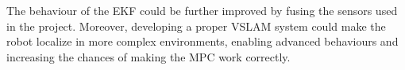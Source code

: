 \documentclass[a4paper]{article}
\begin{document}
The behaviour of the EKF could be further improved by fusing the sensors used in
the project. Moreover, developing a proper VSLAM system could make the robot
localize in more complex environments, enabling advanced behaviours and increasing
the chances of making the MPC work correctly.


\clearpage







\end{document}
